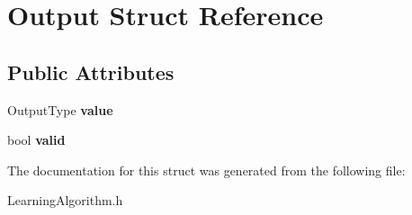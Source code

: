 \hypertarget{structOutput}{
\section{Output Struct Reference}
\label{structOutput}
}
\subsection*{Public Attributes}
\begin{DoxyCompactItemize}
\item 
\hypertarget{structOutput_acbf2c8185d69204b63721d29b3cfda2b}{
OutputType {\bfseries value}}
\label{structOutput_acbf2c8185d69204b63721d29b3cfda2b}

\item 
\hypertarget{structOutput_a10571ec61994587513a0fbd40d94bc30}{
bool {\bfseries valid}}
\label{structOutput_a10571ec61994587513a0fbd40d94bc30}

\end{DoxyCompactItemize}


The documentation for this struct was generated from the following file:\begin{DoxyCompactItemize}
\item 
LearningAlgorithm.h\end{DoxyCompactItemize}
